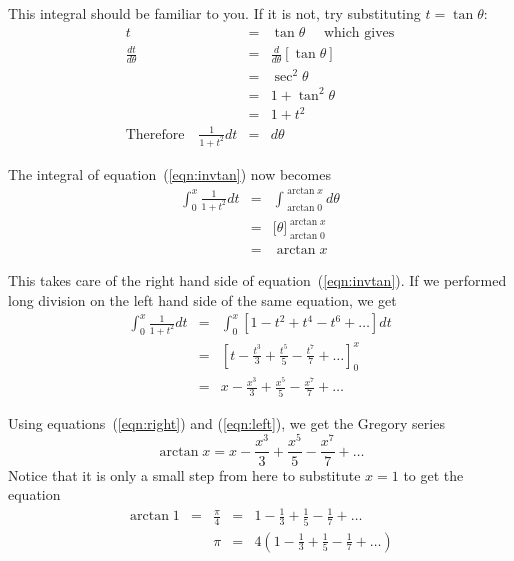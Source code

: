 \documentclass[11pt,a4paper,onecolumn]{article}
\begin{document}
This integral should be familiar to you.  If it is not, try substituting $t = \tan \theta$: %
\[
\begin{array}{rcl}
t & = & \tan \theta \quad \mbox{ which gives} \\
\displaystyle \frac{dt}{d\theta} & = & \displaystyle \frac{d}{d\theta}\left[ \tan \theta \right] \\
& = & \sec^2 \theta \\
& = & 1 + \tan^2 \theta \\
& = & 1 + t^2\\
\mbox{Therefore}\quad\frac{1}{1 + t^2}dt & = & d\theta
\end{array}
\]

The integral of equation~(\ref{eqn:invtan}) now becomes%
%
\begin{equation}
\begin{array}{rcl}
\displaystyle \int_{0}^{x}\frac{1}{1+ t^2}dt %
& = & \displaystyle \int_{\arctan0}^{\arctan x} d\theta\\[1em]
& = & \big[ \theta\big]^{\arctan x}_{\arctan0} \\[1em]
& = & \arctan x
\label{eqn:right}
\end{array}
\end{equation}

This takes care of the right hand side of equation~(\ref{eqn:invtan}).  If we performed long division on the left hand side of the same equation, we get %
\begin{equation}
\begin{array}{rcl}
\displaystyle \int_{0}^{x}\frac{1}{1+ t^2}dt %
& = & \displaystyle \int_{0}^{x}%
\left[ 1 - t^2 + t^4 - t^6 +\dots \right] dt \\[1em]
& = & \displaystyle \left[ t - \frac{t^3}{3} + \frac{t^5}{5} - \frac{t^7}{7}+ \dots \right]_{0}^{x}\\[1em]
& = & \displaystyle x - \frac{x^3}{3} + \frac{x^5}{5} - \frac{x^7}{7}+ \dots
\label{eqn:left}
\end{array}
\end{equation}

Using equations~(\ref{eqn:right}) and (\ref{eqn:left}), we get the Gregory series
%
\begin{equation}
\arctan x = x - \frac{x^3}{3} + \frac{x^5}{5} - \frac{x^7}{7} + \dots
\label{eqn:gregory}
\end{equation}
%
Notice that it is only a small step from here to substitute $x = 1$ to
get the equation %
%
\begin{equation}
\begin{array}{ccccc}
\arctan 1 & = & \frac{\pi}{4} & = & 1 - \frac{1}{3} + \frac{1}{5} - \frac{1}{7} + \dots \\[0.5em]
&  & \pi & = & 4(1 - \frac{1}{3} + \frac{1}{5} - \frac{1}{7} + \dots)
\end{array}
\label{eqn:leibniz}
\end{equation}
\end{document}

